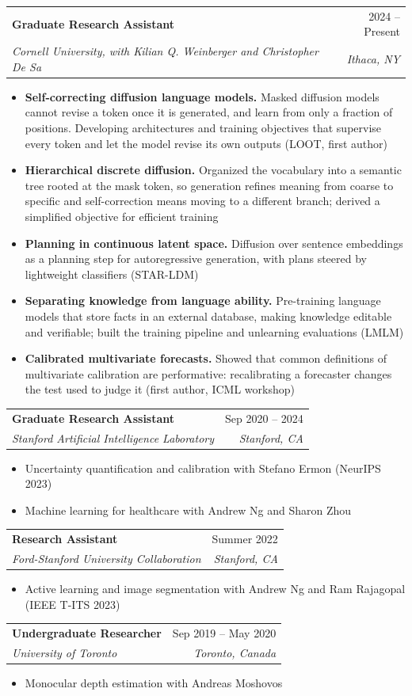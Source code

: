 \documentclass[letterpaper,11pt]{article}
\makeatletter
\newcommand{\resumeItem}[1]{
  \item\small{
    {#1 \vspace{-2pt}}
  }
}
\newcommand{\resumeSubheading}[4]{
  \vspace{-2pt}\item
    \begin{tabular*}{0.97\textwidth}[t]{l@{\extracolsep{\fill}}r}
      \textbf{#1} & #2 \\
      \textit{\small#3} & \textit{\small #4} \\
    \end{tabular*}\vspace{-7pt}
}
\newcommand{\resumeItemListStart}{\begin{itemize}[itemsep=1pt, topsep=3pt]}
\newcommand{\resumeItemListEnd}{\end{itemize}\vspace{0pt}}
\makeatother
\begin{document}
    \resumeSubheading
      {Graduate Research Assistant}{2024 -- Present}
      {Cornell University, with Kilian Q. Weinberger and Christopher De Sa}{Ithaca, NY}
      \resumeItemListStart
        \resumeItem{\textbf{Self-correcting diffusion language models.} Masked diffusion models cannot revise a token once it is generated, and learn from only a fraction of positions. Developing architectures and training objectives that supervise every token and let the model revise its own outputs (LOOT, first author)}
        \resumeItem{\textbf{Hierarchical discrete diffusion.} Organized the vocabulary into a semantic tree rooted at the mask token, so generation refines meaning from coarse to specific and self-correction means moving to a different branch; derived a simplified objective for efficient training}
        \resumeItem{\textbf{Planning in continuous latent space.} Diffusion over sentence embeddings as a planning step for autoregressive generation, with plans steered by lightweight classifiers (STAR-LDM)}
        \resumeItem{\textbf{Separating knowledge from language ability.} Pre-training language models that store facts in an external database, making knowledge editable and verifiable; built the training pipeline and unlearning evaluations (LMLM)}
        \resumeItem{\textbf{Calibrated multivariate forecasts.} Showed that common definitions of multivariate calibration are performative: recalibrating a forecaster changes the test used to judge it (first author, ICML workshop)}
      \resumeItemListEnd

    \resumeSubheading
      {Graduate Research Assistant}{Sep 2020 -- 2024}
      {Stanford Artificial Intelligence Laboratory}{Stanford, CA}
      \resumeItemListStart
        \resumeItem{Uncertainty quantification and calibration with Stefano Ermon (NeurIPS 2023)}
        \resumeItem{Machine learning for healthcare with Andrew Ng and Sharon Zhou}
      \resumeItemListEnd

    \resumeSubheading
      {Research Assistant}{Summer 2022}
      {Ford-Stanford University Collaboration}{Stanford, CA}
      \resumeItemListStart
        \resumeItem{Active learning and image segmentation with Andrew Ng and Ram Rajagopal (IEEE T-ITS 2023)}
      \resumeItemListEnd

    \resumeSubheading
      {Undergraduate Researcher}{Sep 2019 -- May 2020}
      {University of Toronto}{Toronto, Canada}
      \resumeItemListStart
        \resumeItem{Monocular depth estimation with Andreas Moshovos}
      \resumeItemListEnd
\end{document}
